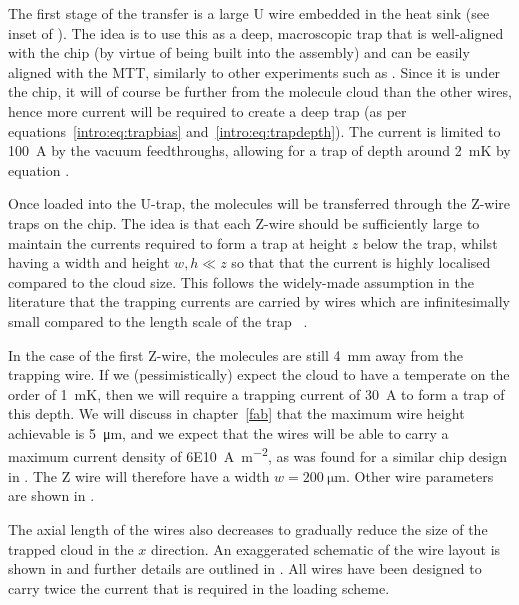 The first stage of the transfer is a large U wire embedded in the heat sink
(see inset of ).  The idea is to use this
as a deep, macroscopic trap that is well-aligned with the chip (by virtue of
being built into the assembly) and can be easily aligned with the MTT,
similarly to other experiments such as .  Since it is under
the chip, it will of course be further from the molecule cloud than the other
wires, hence more current will be required to create a deep trap (as per
equations~\ref{intro:eq:trapbias} and~\ref{intro:eq:trapdepth}). The current is
limited to \SI{100}{\ampere} by the vacuum feedthroughs, allowing for a trap of
depth around \SI{2}{\milli\kelvin} by equation .

Once loaded into the U-trap, the molecules will be transferred through the
Z-wire traps on the chip. The idea is that each Z-wire should be sufficiently
large to maintain the currents required to form a trap at height $z$ below the
trap, whilst having a width and height  $w, h \ll z$ so that that the current
is highly localised compared to the cloud size.  This follows the widely-made
assumption in the literature that the trapping currents are carried by wires
which are infinitesimally small compared to the length scale of the trap
~\cite{2011Ac}.

In the case of the first Z-wire, the molecules are still \SI{4}{\milli\meter}
away from the trapping wire. If we (pessimistically) expect the cloud to have a
temperate on the order of \SI{1}{\milli\kelvin}, then we will require a
trapping current of \SI{30}{\ampere} to form a trap of this depth.  We will
discuss in chapter~\ref{fab} that the maximum wire height achievable is
\SI{5}{\micro\meter}, and we expect that the wires will be able to carry a
maximum current density of \SI{6E10}{\ampere\per\meter\squared}, as was found
for a similar chip design in . The Z wire will
therefore have a width $w=\SI{200}{\micro\meter}$. Other wire parameters are
shown in .

The axial length of the wires also decreases to gradually reduce the size of
the trapped cloud in the $x$ direction. An exaggerated schematic of the wire
layout is shown in  and further details are
outlined in . All wires have been designed to
carry twice the current that is required in the loading scheme.

